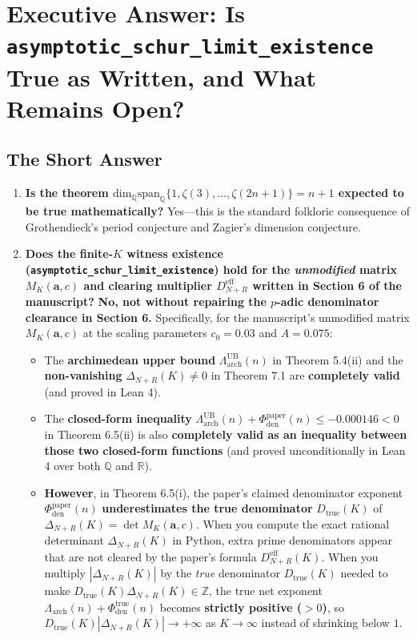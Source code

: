 \documentclass[11pt,a4paper]{article}
\begin{document}
\section{Executive Answer: Is \texttt{asymptotic\_schur\_limit\_existence} True as Written, and What Remains Open?}

\subsection{The Short Answer}

\begin{enumerate}
  \item \textbf{Is the theorem $\mathrm{dim}_{\mathbb{Q}}\mathrm{span}_{\mathbb{Q}}\{1,\zeta(3),\dots,\zeta(2n+1)\} = n+1$ expected to be true mathematically?}
  Yes---this is the standard folkloric consequence of Grothendieck's period conjecture and Zagier's dimension conjecture.

  \item \textbf{Does the finite-$K$ witness existence (\texttt{asymptotic\_schur\_limit\_existence}) hold for the \emph{unmodified} matrix $M_K(\mathbf{a}, c)$ and clearing multiplier $D_{N+R}^{\mathrm{eff}}$ written in Section 6 of the manuscript?}
  \textbf{No, not without repairing the $p$-adic denominator clearance in Section 6.}
  Specifically, for the manuscript's unmodified matrix $M_K(\mathbf{a}, c)$ at the scaling parameters $c_0 = 0.03$ and $A = 0.075$:
  \begin{itemize}
    \item The \textbf{archimedean upper bound} $\Lambda_{\mathrm{arch}}^{\mathrm{UB}}(n)$ in Theorem 5.4(ii) and the \textbf{non-vanishing} $\Delta_{N+R}(K) \neq 0$ in Theorem 7.1 are \textbf{completely valid} (and proved in Lean 4).
    \item The \textbf{closed-form inequality} $\Lambda_{\mathrm{arch}}^{\mathrm{UB}}(n) + \Phi_{\mathrm{den}}^{\mathrm{paper}}(n) \le -0.000146 < 0$ in Theorem 6.5(ii) is also \textbf{completely valid as an inequality between those two closed-form functions} (and proved unconditionally in Lean 4 over both $\mathbb{Q}$ and $\mathbb{R}$).
    \item \textbf{However}, in Theorem 6.5(i), the paper's claimed denominator exponent $\Phi_{\mathrm{den}}^{\mathrm{paper}}(n)$ \textbf{underestimates the true denominator} $D_{\mathrm{true}}(K)$ of $\Delta_{N+R}(K) = \det M_K(\mathbf{a}, c)$. When you compute the exact rational determinant $\Delta_{N+R}(K)$ in Python, extra prime denominators appear that are not cleared by the paper's formula $D_{N+R}^{\mathrm{eff}}(K)$. When you multiply $|\Delta_{N+R}(K)|$ by the \emph{true} denominator $D_{\mathrm{true}}(K)$ needed to make $D_{\mathrm{true}}(K)\Delta_{N+R}(K) \in \mathbb{Z}$, the true net exponent $\Lambda_{\mathrm{arch}}(n) + \Phi_{\mathrm{den}}^{\mathrm{true}}(n)$ becomes \textbf{strictly positive ($> 0$)}, so $D_{\mathrm{true}}(K)|\Delta_{N+R}(K)| \to +\infty$ as $K \to \infty$ instead of shrinking below $1$.
  \end{itemize}
\end{enumerate}
\end{document}
